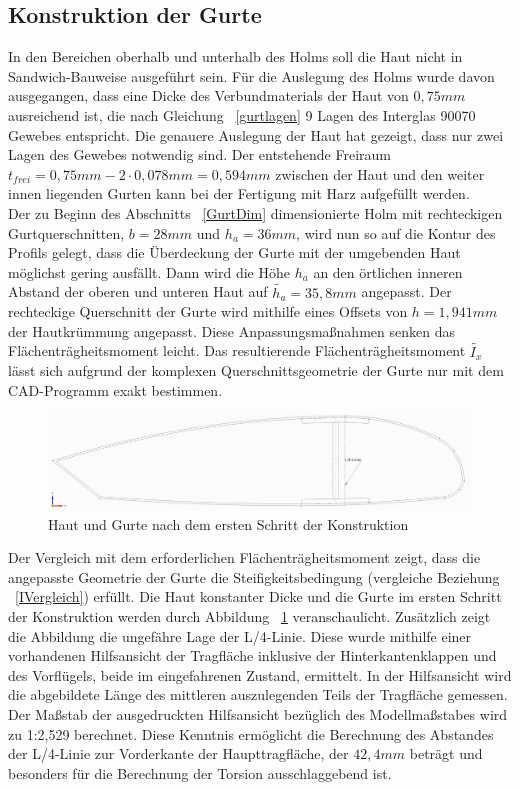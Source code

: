 \subsection{Konstruktion der Gurte}
\noindent In den Bereichen oberhalb und unterhalb des Holms soll die Haut nicht in Sandwich-Bauweise ausgeführt sein. Für die Auslegung des Holms wurde davon ausgegangen, dass eine Dicke des Verbundmaterials der Haut von $ 0,75mm $ ausreichend ist, die nach Gleichung ~\ref{gurtlagen} 9 Lagen des Interglas 90070 Gewebes entspricht. Die genauere Auslegung der Haut hat gezeigt, dass nur zwei Lagen des Gewebes notwendig sind. Der entstehende Freiraum $t_{frei}= 0,75mm-2\cdot 0,078mm=0,594mm $ zwischen der Haut und den weiter innen liegenden Gurten kann bei der Fertigung mit Harz aufgefüllt werden.\\
\noindent Der zu Beginn des Abschnitts ~\ref{GurtDim} dimensionierte Holm mit rechteckigen Gurtquerschnitten, $ b=28mm $ und $ h_{a}=36mm $, wird nun so auf die Kontur des Profils gelegt, dass die Überdeckung der Gurte mit der umgebenden Haut möglichst gering ausfällt. Dann wird die Höhe $ h_{a} $ an den örtlichen inneren Abstand der oberen und unteren Haut auf $\tilde{h_{a}}=35,8mm $ angepasst. Der rechteckige Querschnitt der Gurte wird mithilfe eines Offsets von $ {h}=1,941mm $ der Hautkrümmung angepasst. Diese Anpassungsmaßnahmen senken das Flächenträgheitsmoment leicht. Das resultierende Flächenträgheitsmoment $ \tilde{I_{x}} $ lässt sich aufgrund der komplexen Querschnittsgeometrie der Gurte nur mit dem CAD-Programm exakt bestimmen. 
\begin{figure}[h]
	\includegraphics[width=1.0\textwidth]{Bilder/Kontur.jpg}
	\caption{Haut und Gurte nach dem ersten Schritt der Konstruktion}
	\label{fig: Kontur}
\end{figure} 
Der Vergleich mit dem erforderlichen Flächenträgheitsmoment zeigt, dass die angepasste Geometrie der Gurte die Steifigkeitsbedingung (vergleiche Beziehung ~\ref{IVergleich}) erfüllt. Die Haut konstanter Dicke und die Gurte im ersten Schritt der Konstruktion werden durch Abbildung ~\ref{fig: Kontur} veranschaulicht. Zusätzlich zeigt die Abbildung die ungefähre Lage der L/4-Linie. Diese wurde mithilfe einer vorhandenen Hilfsansicht der Tragfläche inklusive der Hinterkantenklappen und des Vorflügels, beide im eingefahrenen Zustand, ermittelt. In der Hilfsansicht wird die abgebildete Länge des mittleren auszulegenden Teils der Tragfläche gemessen. Der Maßstab der ausgedruckten Hilfsansicht bezüglich des Modellmaßstabes wird zu 1:2,529 berechnet. Diese Kenntnis ermöglicht die Berechnung des Abstandes der L/4-Linie zur Vorderkante der Haupttragfläche, der $ 42,4mm $ beträgt und besonders für die Berechnung der Torsion ausschlaggebend ist.\\

